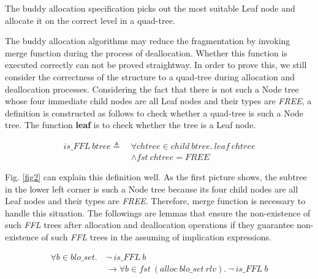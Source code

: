 \begin{theorem}
The buddy allocation specification picks out the most suitable Leaf node and allocate it on the correct level in a quad-tree.
\end{theorem}

The buddy allocation algorithms may reduce the fragmentation by invoking merge function during the process of deallocation. Whether this function is executed correctly can not be proved straightway. In order to prove this, we still consider the correctness of the structure to a quad-tree during allocation and deallocation processes. Considering the fact that there is not such a Node tree whose four immediate child nodes are all Leaf nodes and their types are \emph{FREE}, a definition is constructed as follows to check whether a quad-tree is such a Node tree. The function \textbf{leaf} is to check whether the tree is a Leaf node.

\begin{definition} 
\end{definition}
\vspace{-7pt}
{\footnotesize
\begin{align*}
is\_FFL\ btree \triangleq\ &\forall chtree \in child\ btree.\ leaf\ chtree \\
&\wedge fst\ chtree = FREE
\end{align*}
}
\vspace{-12pt}

Fig. \ref{fig2} can explain this definition well. As the first picture shows, the subtree in the lower left corner is such a Node tree because its four child nodes are all Leaf nodes and their types are \emph{FREE}. Therefore, merge function is necessary to handle this situation. The followings are lemmas that ensure the non-existence of such \emph{FFL} trees after allocation and deallocation operations if they guarantee non-existence of such \emph{FFL} trees in the assuming of implication expressions.

\begin{lemma} 
\label{allocffl}
\end{lemma}
\vspace{-7pt}
{\footnotesize
\begin{align*}
\forall b \in blo\_set.\ &\neg\ is\_FFL\ b \\
&\longrightarrow \forall b \in fst\ (alloc\ blo\_set\ rlv).\ \neg\ is\_FFL\ b
\end{align*}
}
\vspace{-12pt}

